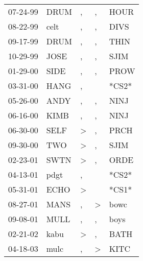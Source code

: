\begin{supertabular}{lllll}
 07-24-99 &  DRUM &             , &             , &   HOUR \\
 08-22-99 &  celt &             , &             , &   DIVS \\
 09-17-99 &  DRUM &             , &             , &   THIN \\
 10-29-99 &  JOSE &             , &             , &   SJIM \\
 01-29-00 &  SIDE &             , &             , &   PROW \\
 03-31-00 &  HANG &             , &               &  *CS2* \\
 05-26-00 &  ANDY &             , &             , &   NINJ \\
 06-16-00 &  KIMB &             , &             , &   NINJ \\
 06-30-00 &  SELF &  \textgreater &             , &   PRCH \\
 09-30-00 &   TWO &  \textgreater &             , &   SJIM \\
 02-23-01 &  SWTN &  \textgreater &             , &   ORDE \\
 04-13-01 &  pdgt &             , &               &  *CS2* \\
 05-31-01 &  ECHO &  \textgreater &               &  *CS1* \\
 08-27-01 &  MANS &             , &  \textgreater &   bowc \\
 09-08-01 &  MULL &             , &             , &   boys \\
 02-21-02 &  kabu &  \textgreater &             , &   BATH \\
 04-18-03 &  mulc &             , &  \textgreater &   KITC \\
\end{supertabular}
